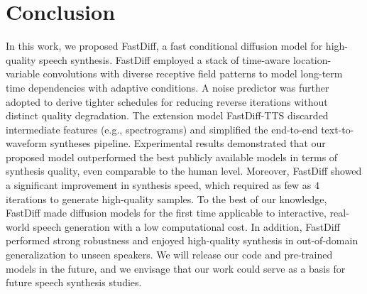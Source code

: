 \section{Conclusion}

In this work, we proposed FastDiff, a fast conditional diffusion model for high-quality speech synthesis. FastDiff employed a stack of time-aware location-variable convolutions with diverse receptive field patterns to model long-term time dependencies with adaptive conditions. A noise predictor was further adopted to derive tighter schedules for reducing reverse iterations without distinct quality degradation. The extension model FastDiff-TTS discarded intermediate features (e.g., spectrograms) and simplified the end-to-end text-to-waveform syntheses pipeline. Experimental results demonstrated that our proposed model outperformed the best publicly available models in terms of synthesis quality, even comparable to the human level.
Moreover, FastDiff showed a significant improvement in synthesis speed, which required as few as $4$ iterations to generate high-quality samples. To the best of our knowledge, FastDiff made diffusion models for the first time applicable to interactive, real-world speech generation with a low computational cost. In addition, FastDiff performed strong robustness and enjoyed high-quality synthesis in out-of-domain generalization to unseen speakers. We will release our code and pre-trained models in the future, and we envisage that our work could serve as a basis for future speech synthesis studies.